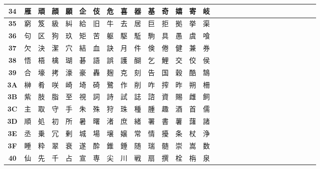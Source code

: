 \begin{table}[H]
\begin{tabular}{|Sc|Sc|Sc|Sc|Sc|Sc|Sc|Sc|Sc|Sc|Sc|Sc|Sc|Sc|Sc|}
\textbf{34} & 雁 & 頑 & 顔 & 願 & 企 & 伎 & 危 & 喜 & 器 & 基 & 奇 & 嬉 & 寄 & 岐 \\ \hline
\textbf{35} & 窮 & 笈 & 級 & 糾 & 給 & 旧 & 牛 & 去 & 居 & 巨 & 拒 & 拠 & 挙 & 渠 \\ \hline
\textbf{36} & 句 & 区 & 狗 & 玖 & 矩 & 苦 & 躯 & 駆 & 駈 & 駒 & 具 & 愚 & 虞 & 喰 \\ \hline
\textbf{37} & 欠 & 決 & 潔 & 穴 & 結 & 血 & 訣 & 月 & 件 & 倹 & 倦 & 健 & 兼 & 券 \\ \hline
\textbf{38} & 悟 & 梧 & 檎 & 瑚 & 碁 & 語 & 誤 & 護 & 醐 & 乞 & 鯉 & 交 & 佼 & 侯 \\ \hline
\textbf{39} & 合 & 壕 & 拷 & 濠 & 豪 & 轟 & 麹 & 克 & 刻 & 告 & 国 & 穀 & 酷 & 鵠 \\ \hline
\textbf{3A} & 榊 & 肴 & 咲 & 崎 & 埼 & 碕 & 鷺 & 作 & 削 & 咋 & 搾 & 昨 & 朔 & 柵 \\ \hline
\textbf{3B} & 紫 & 肢 & 脂 & 至 & 視 & 詞 & 詩 & 試 & 誌 & 諮 & 資 & 賜 & 雌 & 飼 \\ \hline
\textbf{3C} & 主 & 取 & 守 & 手 & 朱 & 殊 & 狩 & 珠 & 種 & 腫 & 趣 & 酒 & 首 & 儒 \\ \hline
\textbf{3D} & 順 & 処 & 初 & 所 & 暑 & 曙 & 渚 & 庶 & 緒 & 署 & 書 & 薯 & 藷 & 諸 \\ \hline
\textbf{3E} & 丞 & 乗 & 冗 & 剰 & 城 & 場 & 壌 & 嬢 & 常 & 情 & 擾 & 条 & 杖 & 浄 \\ \hline
\textbf{3F} & 睡 & 粋 & 翠 & 衰 & 遂 & 酔 & 錐 & 錘 & 随 & 瑞 & 髄 & 崇 & 嵩 & 数 \\ \hline
\textbf{40} & 仙 & 先 & 千 & 占 & 宣 & 専 & 尖 & 川 & 戦 & 扇 & 撰 & 栓 & 栴 & 泉 \\ \hline
\end{tabular}
\end{table}

